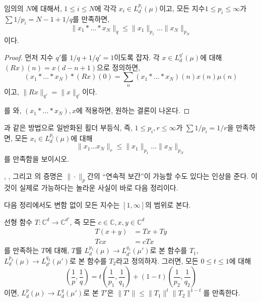\begin{theorem}[Young]
\label{thm:youngineq2}  
    임의의 $N$에 대해서, $1 \leq i \leq N$에 각각 $x_i \in L^{p_i}_d(\mu)$이고, 모든 지수$1 \leq p_i \leq \infty$가 $\sum 1/p_i = N - 1 + 1/q$를 만족하면,
    \begin{equation*}
        \|x_1 * \dots * x_N\|_q \leq \|x_1\|_{p_1} \dots \|x_N\|_{p_N}
    \end{equation*}
    이다.
\end{theorem}
\begin{proof}
    먼저 지수 $q'$를 $1/q + 1/q' = 1$이도록 잡자.
    각 $x \in L^{q'}_d(\mu)$에 대해 $(Rx)(n) = x(d - n + 1)$으로 정의하면,
    \begin{equation*}
        (x_1 * \dots * x_N) * (Rx)(0) = \sum_n (x_1 * \dots * x_N)(n)x(n) \mu(n)
    \end{equation*}
    이고, $\|Rx\|_{q'} = \|x\|_{q'}$이다.
    
    를 와, $(x_1 * \dots * x_N), x$에 적용하면, 원하는 결론이 나온다.
\end{proof}

\begin{exercise}
    과 같은 방법으로 일반화된 횔더 부등식, 즉, $1 \leq p_i, r \leq \infty$가 $\sum 1/p_i = 1/r$을 만족하면, 모든 $x_i \in L^{p_i}_d(\mu)$에 대해
    \begin{equation*}
        \|x_1 \dots x_N\|_r \leq \|x_1\|_{p_1} \dots \|x_N\|_{p_N}
    \end{equation*}
    를 만족함을 보이시오.
\end{exercise}

, , 그리고 의 증명은 $\|\cdot\|_p$간의 ``연속적 보간''이 가능할 수도 있다는 인상을 준다.
이것이 실제로 가능하다는 놀라운 사실이 바로 다음 정리이다.

다음 정리에서도 변함 없이 모든 지수는 $[1, \infty]$의 범위로 본다.
\begin{theorem}
\label{thm:rieszint}  
    선형 함수 $T: \mathbb{C}^d \to \mathbb{C}^{d'}$, 즉 모든 $c \in \mathbb{C}, x, y \in \mathbb{C}^d$
    \begin{align*}
        T(x + y) &= Tx + Ty \\
        Tcx &= cTx
    \end{align*}
    를 만족하는 $T$에 대해, $T$를 $L^{p_1}_d(\mu) \to L^{q_1}_{d'}(\mu')$로 본 함수를 $T_1$, $L^{p_2}_d(\mu) \to L^{q_2}_{d'}(\mu')$로 본 함수를 $T_2$라고 정의하자.
    그러면, 모든 $0 \leq t \leq 1$에 대해
    \begin{equation*}
        \left(\frac{1}{p}, \frac{1}{q}\right) = t \left(\frac{1}{p_1}, \frac{1}{q_1}\right) + (1 - t) \left(\frac{1}{p_2}, \frac{1}{q_2}\right)
    \end{equation*}
    이면, $L^p_d(\mu) \to L^q_d(\mu')$로 본 $T'$은 $\|T'\| \leq \|T_1\|^t \|T_2\|^{1 - t}$를 만족한다.
\end{theorem}

